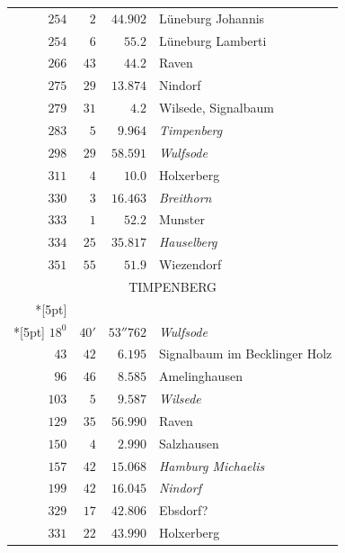 \begin{longtable}{@{}rrrp{.61\linewidth}@{}}
\(254\)&\(2\)&\(44.902\)&\raggedright Lüneburg Johannis\tabularnewline
\(254\)&\(6\)&\(55.2\)&\raggedright Lüneburg Lamberti\tabularnewline
\(266\)&\(43\)&\(44.2\)&\raggedright Raven\tabularnewline
\(275\)&\(29\)&\(13.874\)&\raggedright Nindorf\tabularnewline
\(279\)&\(31\)&\(4.2\)&\raggedright Wilsede, Signalbaum\tabularnewline
\(283\)&\(5\)&\(9.964\)&\raggedright \textit{Timpenberg}\tabularnewline
\(298\)&\(29\)&\(58.591\)&\raggedright \textit{Wulfsode}\tabularnewline
\(311\)&\(4\)&\(10.0\)&\raggedright Holxerberg\tabularnewline
\(330\)&\(3\)&\(16.463\)&\raggedright \textit{Breithorn}\tabularnewline
\(333\)&\(1\)&\(52.2\)&\raggedright Munster\tabularnewline
\(334\)&\(25\)&\(35.817\)&\raggedright \textit{Hauselberg}\tabularnewline
\(351\)&\(55\)&\(51.9\)&\raggedright Wiezendorf\tabularnewline
\multicolumn{4}{c}{\strut TIMPENBERG}\\*[5pt]
\multicolumn{4}{c}{\(-177253.420\)\qquad\(-21852.221\)}\\*[5pt]
\(18^{0}\)&\(40'\)&\(53''762\)&\raggedright \textit{Wulfsode}\tabularnewline
\(43\)&\(42\)&\(6.195\)&\raggedright Signalbaum im Becklinger Holz\tabularnewline
\(96\)&\(46\)&\(8.585\)&\raggedright Amelinghausen\tabularnewline
\(103\)&\(5\)&\(9.587\)&\raggedright \textit{Wilsede}\tabularnewline
\(129\)&\(35\)&\(56.990\)&\raggedright Raven\tabularnewline
\(150\)&\(4\)&\(2.990\)&\raggedright Salzhausen\tabularnewline
\(157\)&\(42\)&\(15.068\)&\raggedright \textit{Hamburg Michaelis}\tabularnewline
\(199\)&\(42\)&\(16.045\)&\raggedright \textit{Nindorf}\tabularnewline
\(329\)&\(17\)&\(42.806\)&\raggedright Ebsdorf?\tabularnewline
\(331\)&\(22\)&\(43.990\)&\raggedright Holxerberg\tabularnewline
\end{longtable}
\endgroup
